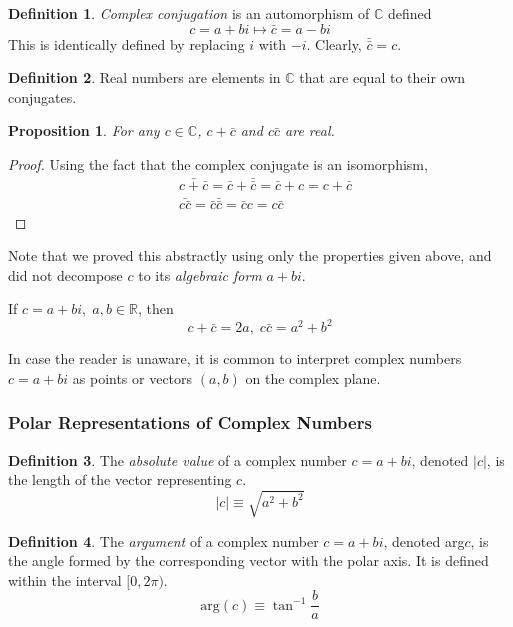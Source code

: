 \documentclass{article}
\newtheorem{proposition}[theorem]{Proposition}
\theoremstyle{remark}
\theoremstyle{definition}
\newtheorem{definition}{Definition}[section]
\begin{document}
\begin{definition}
\textit{Complex conjugation} is an automorphism of $\mathbb{C}$ defined
\[ c = a + b i \mapsto \bar{c} = a - b i\]
This is identically defined by replacing $i$ with $-i$. Clearly, $\bar{\bar{c}} = c$. 
\end{definition}

\begin{definition}
Real numbers are elements in $\mathbb{C}$ that are equal to their own conjugates. 
\end{definition}

\begin{proposition}
For any $c \in \mathbb{C}$, $c + \bar{c}$ and $c \bar{c}$ are real. 
\end{proposition}
\begin{proof}
Using the fact that the complex conjugate is an isomorphism, 
\begin{align*}
    & \bar{c + \bar{c}} = \bar{c} + \bar{\bar{c}} = \bar{c} + c = c + \bar{c} \\
    & \bar{ c \bar{c}} = \bar{c} \bar{\bar{c}} = \bar{c} c = c \bar{c}
\end{align*}
\end{proof}
Note that we proved this abstractly using only the properties given above, and did not decompose $c$ to its \textit{algebraic form} $a + b i$. 

If $c = a + b i, \; a, b \in \mathbb{R}$, then 
\[ c + \bar{c} = 2a, \; c \bar{c} = a^2 + b^2\]

In case the reader is unaware, it is common to interpret complex numbers $c = a + b i$ as points or vectors $(a, b)$ on the complex plane. 

\subsubsection{Polar Representations of Complex Numbers}
\begin{definition}
The \textit{absolute value} of a complex number $c = a + b i$, denoted $|c|$, is the length of the vector representing $c$. 
\[ |c| \equiv \sqrt{a^2 + b^2}\]
\end{definition}

\begin{definition}
The \textit{argument} of a complex number $c = a + b i$, denoted arg$c$, is the angle formed by the corresponding vector with the polar axis. It is defined within the interval $[0, 2\pi)$. 
\[ \text{arg}(c) \equiv \tan^{-1}{\frac{b}{a}}\]
\end{definition}
\end{document}
